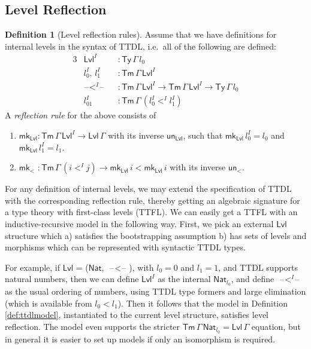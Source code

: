 \documentclass[a4paper,UKenglish,cleveref, autoref, thm-restate]{lipics-v2021}
\theoremstyle{remark}
\theoremstyle{definition}
\newtheorem{mydefinition}{Definition}
\newcommand{\Ty}{\mathsf{Ty}}
\newcommand{\Tm}{\mathsf{Tm}}
\newcommand{\blank}{\mathord{\hspace{1pt}\text{--}\hspace{1pt}}}
\newcommand{\Nat}{\mathsf{Nat}}
\newcommand{\Lvl}{\mathsf{Lvl}}
\newcommand{\msf}[1]{\mathsf{#1}}
\newcommand{\mkMor}{\msf{mk}\!_<}
\newcommand{\unMor}{\msf{un}\!_<}
\newcommand{\mkLvl}{\msf{mk}_{\Lvl}}
\newcommand{\unLvl}{\msf{un}_{\Lvl}}
\begin{document}
\subsection{Level Reflection}\label{sec:level_reflection}

\begin{mydefinition}[Level reflection rules]
Assume that we have definitions for internal levels in the syntax of TTDL,
i.e.\ all of the following are defined:
\begin{alignat*}{3}
  &\Lvl^I               &&: \Ty\,\Gamma\,l_0\\
  &l_0^I,\,l_1^I         &&: \Tm\,\Gamma\,\Lvl^I \\
  &\blank\!<^I\!\blank  &&: \Tm\,\Gamma\,\Lvl^I \to \Tm\,\Gamma\,\Lvl^I \to \Ty\,\Gamma\,l_0\\
  &l_{01}^{I}            &&: \Tm\,\Gamma\,(l_0^I <^I l_1^I)
\end{alignat*}
A \emph{reflection rule} for the above consists of
\begin{enumerate}
  \item $\mkLvl : \Tm\,\Gamma\,\Lvl^I \to \Lvl\,\Gamma$ with its inverse $\unLvl$, such that $\mkLvl\,l_0^I = l_0$ and $\mkLvl\,l_1^I = l_1$.
  \item $\mkMor\,\,: \Tm\,\Gamma\,(i <^I j) \to \mkLvl\,i < \mkLvl\,i$ with its inverse
        $\unMor$.
\end{enumerate}
\end{mydefinition}

For any definition of internal levels, we may extend the specification of TTDL
with the corresponding reflection rule, thereby getting an algebraic signature
for a type theory with first-class levels (TTFL). We can easily get a TTFL with
an inductive-recursive model in the following way. First, we pick an external
$\Lvl$ structure which a) satisfies the bootstrapping assumption b) has sets of
levels and morphisms which can be represented with syntactic TTDL types.

For example, if $\Lvl$ = ($\Nat$, $\blank\!<\!\blank$), with $l_0 = 0$ and $l_1
= 1$, and TTDL supports natural numbers, then we can define $\Lvl^I$ as the
internal $\Nat_{l_0}$, and define $\blank\!<^I\!\blank$ as the usual ordering of
numbers, using TTDL type formers and large elimination (which is available from
$l_0 < l_1$). Then it follows that the model in Definition \ref{def:ttdlmodel},
instantiated to the current level structure, satisfies level reflection. The
model even supports the stricter $\Tm\,\Gamma\,\Nat_{l_0} = \Lvl\,\Gamma$
equation, but in general it is easier to set up models if only an isomorphism
is required.
\end{document}
